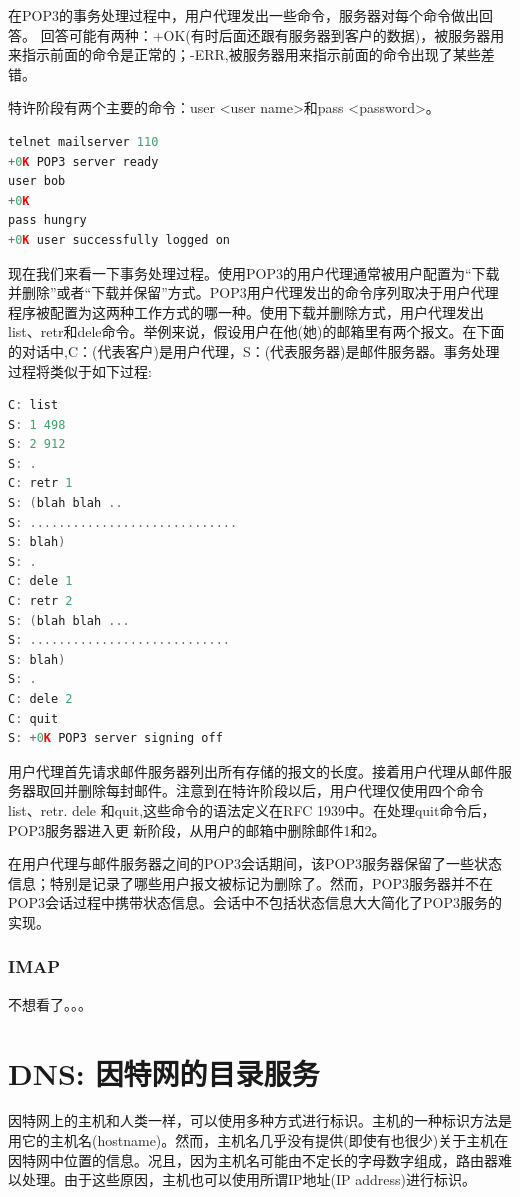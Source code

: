     在POP3的事务处理过程中，用户代理发出一些命令，服务器对每个命令做出回答。 回答可能有两种：+OK(有时后面还跟有服务器到客户的数据)，被服务器用来指示前面的命令是正常的；-ERR,被服务器用来指示前面的命令出现了某些差错。

    特许阶段有两个主要的命令：user <user name>和pass <password>。

\begin{lstlisting}[language=C++]
telnet mailserver 110
+0K POP3 server ready
user bob
+0K
pass hungry
+0K user successfully logged on
\end{lstlisting}

    现在我们来看一下事务处理过程。使用POP3的用户代理通常被用户配置为“下载并删除”或者“下载并保留”方式。POP3用户代理发岀的命令序列取决于用户代理程序被配置为这两种工作方式的哪一种。使用下载并删除方式，用户代理发出list、retr和dele命令。举例来说，假设用户在他(她)的邮箱里有两个报文。在下面的对话中,C：(代表客户)是用户代理，S：(代表服务器)是邮件服务器。事务处理过程将类似于如下过程:

\begin{lstlisting}[language=C++]
C: list
S: 1 498
S: 2 912
S: .
C: retr 1
S: (blah blah ..
S: .............................
S: blah)
S: .
C: dele 1
C: retr 2
S: (blah blah ...
S: ............................
S: blah)
S: .
C: dele 2
C: quit
S: +0K POP3 server signing off
\end{lstlisting}

    用户代理首先请求邮件服务器列出所有存储的报文的长度。接着用户代理从邮件服务器取回并删除每封邮件。注意到在特许阶段以后，用户代理仅使用四个命令list、retr. dele 和quit,这些命令的语法定义在RFC 1939中。在处理quit命令后，POP3服务器进入更 新阶段，从用户的邮箱中删除邮件1和2。

    在用户代理与邮件服务器之间的POP3会话期间，该POP3服务器保留了一些状态信息；特别是记录了哪些用户报文被标记为删除了。然而，POP3服务器并不在POP3会话过程中携带状态信息。会话中不包括状态信息大大简化了POP3服务的实现。

\subsubsection{IMAP}

    不想看了。。。

\section{DNS: 因特网的目录服务}

    因特网上的主机和人类一样，可以使用多种方式进行标识。主机的一种标识方法是用它的主机名(hostname)。然而，主机名几乎没有提供(即使有也很少)关于主机在因特网中位置的信息。况且，因为主机名可能由不定长的字母数字组成，路由器难以处理。由于这些原因，主机也可以使用所谓IP地址(IP address)进行标识。

